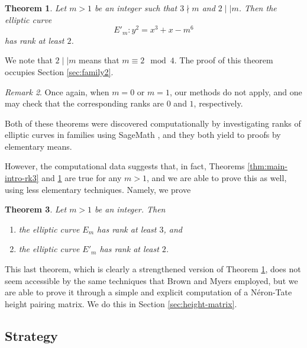\documentclass{amsart}
\newtheorem{theorem}{Theorem}[section]
\numberwithin{equation}{section}
\theoremstyle{remark}
\newtheorem{remark}[theorem]{Remark}
\begin{document}
\begin{theorem}\label{thm:main-intro-rk2}
Let $m>1$ be an integer such that $3 \nmid m$ and $2 \mid \mid m$. Then the elliptic curve
\[
E'_m \colon y^2 = x^3 + x - m^6
\]
has rank at least $2$.
\end{theorem}

We note that $2 \mid \mid m$ means that $m \equiv 2 \mod 4$. The proof of this theorem occupies Section \ref{sec:family2}.

\begin{remark}
Once again, when $m=0$ or $m=1$, our methods do not apply, and one may check that the corresponding ranks are $0$ and $1$, respectively.
\end{remark}

Both of these theorems were discovered computationally by investigating ranks of elliptic curves in families using SageMath \cite{sage}, and they both yield to proofs by elementary means.

However, the computational data suggests that, in fact, Theorems  \ref{thm:main-intro-rk3} and \ref{thm:main-intro-rk2} are true for any $m>1$, and we are able to prove this as well, using less elementary techniques. Namely, we prove

\begin{theorem}\label{thm:unconditional}
Let $m > 1$ be an integer. Then
\begin{enumerate}
\item the elliptic curve $E_m$ has rank at least $3$, and
\item the elliptic curve $E'_m$ has rank at least $2$.
\end{enumerate}
\end{theorem}


This last theorem, which is clearly a strengthened version of Theorem \ref{thm:main-intro-rk2}, does not seem accessible by the same techniques that Brown and Myers employed, but we are able to prove it through a simple and explicit computation of a N\'{e}ron-Tate height pairing matrix. We do this in Section \ref{sec:height-matrix}.

\iffalse
\subsection{Brief introduction to elliptic curves for nonexperts}

Elliptic curves
\fi
\subsection{Strategy}
\end{document}

